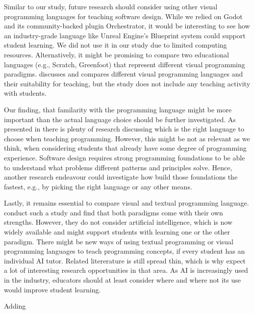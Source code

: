 Similar to our study, future research should consider using other visual
programming languages for teaching software design. While we relied on Godot
and its community-backed plugin Orchestrator, it would be interesting to see
how an industry-grade language like Unreal Engine's Blueprint \cite{epicgames_blueprints_2025}
system could support student learning. We did not use it in our study due to
limited computing resources. Alternatively, it might be promising to compare
two educational languages (e.g., Scratch, Greenfoot) that represent different
visual programming paradigms. \cite{utting_alice_2010} discusses and compares
different visual programming languages and their suitability for teaching, but
the study does not include any teaching activity with students.

Our finding, that familarity with the programming language might be more
important than the actual language choice should be further investigated.
As presented in \cite{mannila_objective_2006} \cite{meszarosova_is_2015}
there is plenty of research
discussing which is the right language to choose when teaching programming.
However, this might be not as relevant as we think, when considering students
that already have some degree of programming experience. Software design
requires strong programming foundations to be able to understand what problems
different patterns and principles solve. Hence, another research endeavour
could investigate how build those foundations the fastest, e.g., by picking
the right language or any other means.

Lastly, it remains essential to compare visual and textual programming language.
\cite{fernandes_blocks_2026} conduct such a study and find that both paradigms
come with their own strengths. However, they do not consider artificial intelligence,
which is now widely available and might support students with learning one or
the other paradigm. There might be new ways of using textual programming or visual
programming languages to teach programming concepts, if every student has an
individual AI tutor. Related litererature is still spread thin, which is why expect
a lot of interesting research opportunities in that area. As AI is increasingly used
in the industry, educators should at least consider where and where not its use
would improve student learning.

Adding